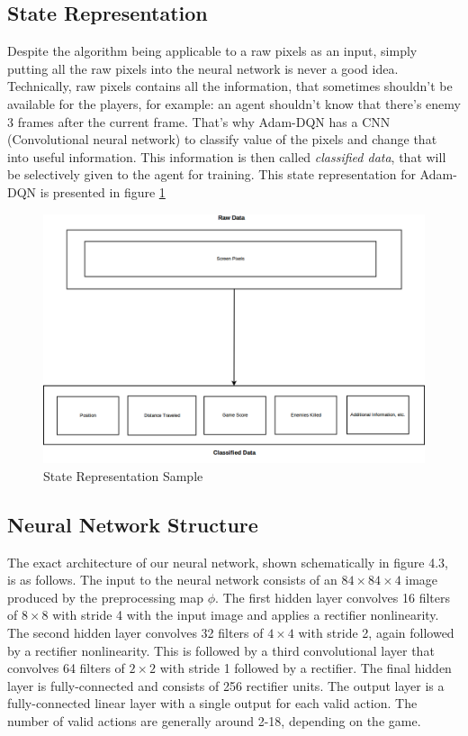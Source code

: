     \subsection{State Representation}
        Despite the algorithm being applicable to a raw pixels as an input, simply putting all the raw pixels into the neural network is never a good idea. Technically, raw pixels contains all the information, that sometimes shouldn't be available for the players, for example: an agent shouldn't know that there's enemy 3 frames after the current frame. That's why Adam-DQN has a CNN (Convolutional neural network) to classify value of the pixels and change that into useful information. This information is then called \textit{classified data}, that will be selectively given to the agent for training. 
        \noindent
        This state representation for Adam-DQN is presented in figure \ref{fig:42}
        \begin{figure}[H]
            \centering
            \includegraphics[scale=0.35]{images/data.png}
            \caption{State Representation Sample}
            \label{fig:42}
        \end{figure}
    
    
    \subsection{Neural Network Structure}
    The exact architecture of our neural network, shown schematically in figure 4.3, is as follows. The input to the neural network consists of an $84 \times 84 \times 4$ image produced by the preprocessing map $\phi$. The first hidden layer convolves 16 filters of $8\times 8$ with stride 4 with the input image and applies a rectifier nonlinearity. The second hidden layer convolves 32 filters of $4 \times 4$ with stride 2, again followed by a rectifier nonlinearity. This is followed by a third convolutional layer that convolves 64 filters of $2 \times 2$ with stride 1 followed by a rectifier. The final hidden layer is fully-connected and consists of 256 rectifier units. The output layer is a fully-connected linear layer with a single output for each valid action. The number of valid actions are generally around 2-18, depending on the game.
    
